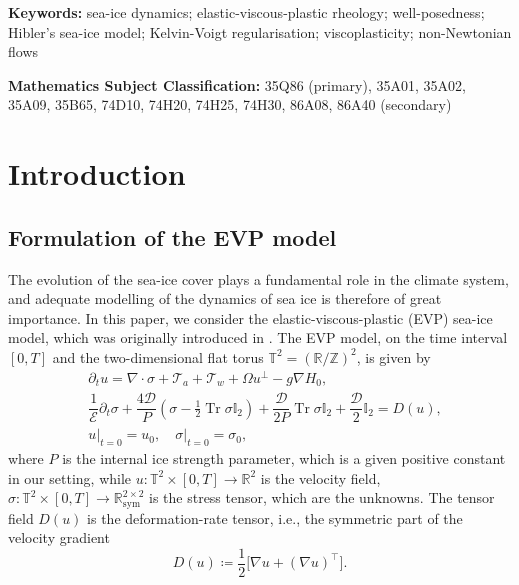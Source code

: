 \documentclass[12pt,a4paper]{article}
\theoremstyle{definition}
\theoremstyle{remark}
\numberwithin{equation}{section}
\DeclareMathOperator{\Tr}{Tr}
\begin{document}
\noindent \textbf{Keywords:} sea-ice dynamics; elastic-viscous-plastic rheology; well-posedness; Hibler's sea-ice model; Kelvin-Voigt regularisation; viscoplasticity; non-Newtonian flows

\vspace{0.1cm} \noindent \textbf{Mathematics Subject Classification:} 35Q86 (primary), 35A01, 35A02, 35A09, 35B65, 74D10, 74H20, 74H25, 74H30, 86A08, 86A40 (secondary)

\section{Introduction}
\subsection{Formulation of the EVP model}
The evolution of the sea-ice cover plays a fundamental role in the climate system, and adequate modelling of the dynamics of sea ice is therefore of great importance. In this paper, we consider the elastic-viscous-plastic (EVP) sea-ice model, which was originally introduced in \cite{hunke}. The EVP model, on the time interval $[0,T]$ and the two-dimensional flat torus $\mathbb{T}^2 = (\mathbb{R} / \mathbb{Z})^2$, is given by
\begin{subequations} \label{EVPsystem}
\begin{align}
&\partial_t u  = \nabla \cdot \sigma + \mathcal{T}_a + \mathcal{T}_w + \Omega u^\perp - g \nabla H_0, \label{EVP1} \\
&\dfrac{1}{\mathcal E} \partial_t \sigma + \dfrac{4 \mathcal{D}}{P} (\sigma - \frac{1}{2} \Tr \sigma \mathbb I_2) + \dfrac{\mathcal{D}}{2P} \Tr \sigma \mathbb I_2 + \dfrac{\mathcal{D}}{2} \mathbb I_2  = D(u), \label{EVP2}
\\
&u \lvert_{t = 0} = u_0, \quad \sigma \lvert_{t = 0} = \sigma_0, \label{EVP3}
\end{align}
\end{subequations}
where $P$ is the internal ice strength parameter, which is a given positive constant in our setting, while $u : \mathbb{T}^2 \times [0,T] \rightarrow \mathbb{R}^2$ is the velocity field, $\sigma : \mathbb{T}^2 \times [0,T] \rightarrow \mathbb{R}^{2 \times 2}_{\mathrm{sym}}$ is the stress tensor, which are the unknowns. The tensor field $D(u)$ is the deformation-rate tensor, i.e., the symmetric part of the velocity gradient
\begin{equation}
D(u) \coloneqq \frac{1}{2} \lbrack \nabla u + (\nabla u)^\top \rbrack.
 \end{equation}
\end{document}
